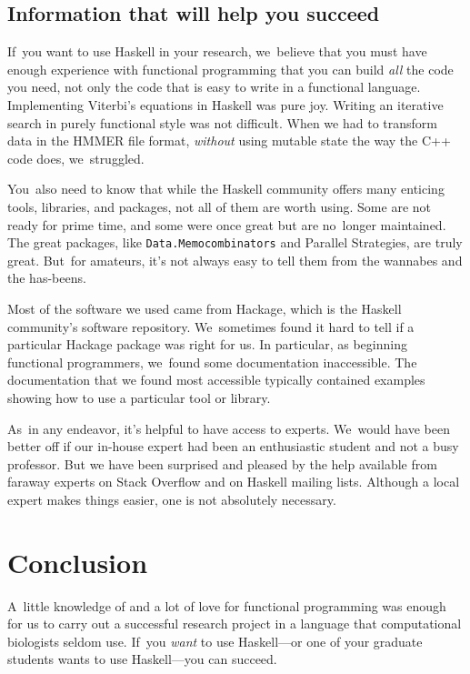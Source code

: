 \documentclass[preprint,nonatbib,blockstyle,nocopyrightspace,times]{sigplanconf}
\newcommand\seclabel[1]{\label{sec:#1}}
\begin{document}
\subsection{Information that will help you succeed}

If~you want to use Haskell in your research, we~believe that you must
have enough experience with functional programming that you can build
\emph{all} the code you need, not only the code that is easy to write
in a functional language.
Implementing Viterbi's equations in Haskell was pure joy.
Writing an iterative search in purely functional style was not
difficult.
When we had to transform data in the HMMER file format, \emph{without}
using mutable state the way the C++ code does, we~struggled.

\seclabel{penumbra}

You~also need to know that while the Haskell community offers many
enticing tools, libraries, and packages,
not all of them are worth using.
Some are not ready for prime time, and some were once great but are
no~longer maintained.
The great packages, like \texttt{Data.Memocombinators} and Parallel
Strategies, are truly great.
But~for amateurs, it's not always easy to tell them from the wannabes
and the has-beens.

Most of the software we used came from Hackage, which is the Haskell
community's software repository.
We~sometimes found it hard to tell
if a particular Hackage package was right for us.
In particular, as beginning 
functional programmers, we~found some documentation inaccessible.
The documentation that we found most accessible typically contained
examples showing how to use a particular tool or library.


As~in any endeavor, it's helpful to have access to experts.
We~would have been better off if our in-house expert had been an
enthusiastic student and not a busy professor.
But we have been surprised and pleased by the help available from
faraway experts on Stack Overflow and on Haskell mailing lists.
Although a local expert makes things easier, one is not
 absolutely necessary.


\section{Conclusion}

A~little knowledge of and a lot of love for functional programming was
enough for us to carry out a successful research project in a language
that computational biologists seldom use.
If~you \emph{want} to use Haskell---or one of your graduate students
wants to use Haskell---you can
succeed. 
\end{document}
